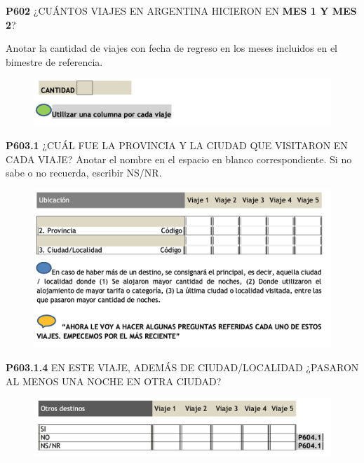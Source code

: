 \documentclass[
  openany]{book}
\begin{document}
\textbf{P602} ¿CUÁNTOS VIAJES EN ARGENTINA HICIERON EN \textbf{MES 1 Y MES 2}?

Anotar la cantidad de viajes con fecha de regreso en los meses incluidos en el bimestre de referencia.

\begin{figure}

{\centering \includegraphics[width=1\linewidth]{imagenes/figura6-207} 

}

\end{figure}

\textbf{P603.1} ¿CUÁL FUE LA PROVINCIA Y LA CIUDAD QUE VISITARON EN CADA VIAJE?
Anotar el nombre en el espacio en blanco correspondiente. Si no sabe o no recuerda, escribir NS/NR.

\begin{figure}

{\centering \includegraphics[width=1\linewidth]{imagenes/figura6-208} 

}

\end{figure}

\textbf{P603.1.4} EN ESTE VIAJE, ADEMÁS DE CIUDAD/LOCALIDAD ¿PASARON AL MENOS UNA NOCHE EN OTRA CIUDAD?

\begin{figure}

{\centering \includegraphics[width=1\linewidth]{imagenes/figura6-209} 

}

\end{figure}
\end{document}
